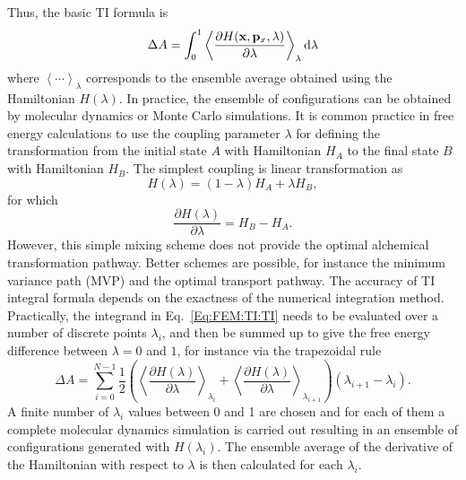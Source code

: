 Thus, the basic TI formula is
\begin{equation}
\Delta A = \int_{0}^{1}\left \langle \frac{\partial{H(\mathbf{x},\mathbf{p}_{x},\lambda)}}{\partial{\lambda}} \right \rangle_{\lambda} \mathop{}\!\mathrm{d}\lambda
\label{Eq:FEM:TI:TI}
\end{equation} 
where $\left \langle \cdots \right \rangle _{\lambda}$ corresponds to the ensemble average obtained using the Hamiltonian $H(\lambda)$. In practice, the ensemble of configurations can be obtained by molecular dynamics or Monte Carlo simulations. It is common practice in free energy calculations to use the coupling parameter $\lambda$ for defining the transformation from the initial state $A$ with Hamiltonian $H_{A}$ to the final state $B$ with Hamiltonian $H_{B}$. The simplest coupling is linear transformation as
\begin{equation}
H(\lambda) = (1-\lambda) H_{A} + \lambda H_{B},
\end{equation}
for which
\begin{equation}
	\frac{\partial{H(\lambda)}}{\partial{\lambda}}=H_B-H_A. 
\end{equation}
However, this simple mixing scheme does not provide the optimal alchemical transformation pathway. Better schemes are possible, for instance the minimum variance path (MVP)\cite{BlondelJCC2004} and the optimal transport pathway\cite{DecherchiJPCL2023}. 
The accuracy of TI integral formula depends on the exactness of the numerical integration method.\cite{PaliwalJCTC2011} Practically, the integrand in Eq.~\ref{Eq:FEM:TI:TI} needs to be evaluated over a number of discrete points $\lambda_{i}$, and then be summed up to give the free energy difference between $\lambda=0$ and $1$, for instance via the trapezoidal rule
\begin{equation}
\Delta A = \sum_{i=0}^{N-1}\frac{1}{2}\left(\left \langle \frac{\partial{H(\lambda)}}{\partial{\lambda}} \right \rangle_{\lambda_{i}} + \left \langle\frac{\partial{H(\lambda)}}{\partial{\lambda}} \right \rangle_{\lambda_{i+1}}\right)
(\lambda_{i+1}-\lambda_i).
\label{Eq:FEM:TI:dTI}
\end{equation} 
A finite number of $\lambda_{i}$ values between 0 and 1 are chosen and for each of them a complete molecular dynamics simulation is carried out resulting in an ensemble of configurations generated with $H(\lambda_{i})$.
The ensemble average of the derivative of the Hamiltonian with respect to $\lambda$ is then calculated for each $\lambda_{i}$.
	
